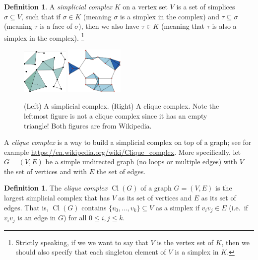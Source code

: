 \documentclass[amscd, amssymb, verbatim]{amsart}[12pt]
\theoremstyle{plain}
\theoremstyle{definition}
\newtheorem{definition}[lemma]{Definition}
\DeclareMathOperator{\cl}{Cl}
\begin{document}
\begin{definition}
A \emph{simplicial complex} $K$ on a vertex set $V$ is a set of simplices $\sigma \subseteq V$, such that if $\sigma\in K$ (meaning $\sigma$ is a simplex in the complex) and $\tau\subseteq\sigma$ (meaning $\tau$ is a face of $\sigma$), then we also have $\tau\in K$ (meaning that $\tau$ is also a simplex in the complex).
\footnote{Strictly speaking, if we we want to say that $V$ is the vertex set of $K$, then we should also specify that each singleton element of $V$ is a simplex in $K$.}
\end{definition}

\begin{figure}[h]
\centering
\includegraphics[width=0.2\textwidth]{SimplicialComplex.png}
\hspace{20mm}
\includegraphics[width=0.25\textwidth]{CliqueComplex.png}
\caption{(Left) A simplicial complex. (Right) A clique complex.
Note the leftmost figure is not a clique complex since it has an empty triangle!
Both figures are from Wikipedia.}
\label{fig:simplicialComplex}
\end{figure}

A \emph{clique complex} is a way to build a simplicial complex on top of a graph; see for example \url{https://en.wikipedia.org/wiki/Clique\_complex}.
More specifically, let $G=(V,E)$ be a simple undirected graph (no loops or multiple edges) with $V$ the set of vertices and with $E$ the set of edges.

\begin{definition}
The \emph{clique complex $\cl(G)$} of a graph $G=(V,E)$ is the largest simplicial complex that has $V$ as its set of vertices and $E$ as its set of edges.
That is, $\cl(G)$ contains $\{v_0,\ldots,v_k\}\subseteq V$ as a simplex if $v_iv_j\in E$ (i.e.\ if $v_iv_j$ is an edge in $G$) for all $0\le i,j\le k$.
\end{definition}
\end{document}
